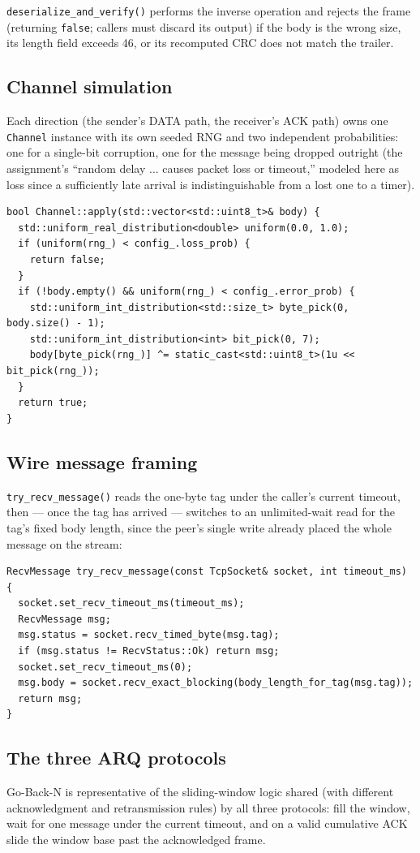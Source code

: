 \documentclass[11pt]{article}
\begin{document}
\texttt{deserialize\_and\_verify()} performs the inverse operation and rejects the frame (returning
\texttt{false}; callers must discard its output) if the body is the wrong size, its length field exceeds 46, or
its recomputed CRC does not match the trailer.

\subsection{Channel simulation}
Each direction (the sender's DATA path, the receiver's ACK path) owns one \texttt{Channel} instance
with its own seeded RNG and two independent probabilities: one for a single-bit corruption, one for
the message being dropped outright (the assignment's ``random delay ... causes packet loss or
timeout,'' modeled here as loss since a sufficiently late arrival is indistinguishable from a lost one to
a timer).

\begin{lstlisting}
bool Channel::apply(std::vector<std::uint8_t>& body) {
  std::uniform_real_distribution<double> uniform(0.0, 1.0);
  if (uniform(rng_) < config_.loss_prob) {
    return false;
  }
  if (!body.empty() && uniform(rng_) < config_.error_prob) {
    std::uniform_int_distribution<std::size_t> byte_pick(0, body.size() - 1);
    std::uniform_int_distribution<int> bit_pick(0, 7);
    body[byte_pick(rng_)] ^= static_cast<std::uint8_t>(1u << bit_pick(rng_));
  }
  return true;
}
\end{lstlisting}

\subsection{Wire message framing}
\texttt{try\_recv\_message()} reads the one-byte tag under the caller's current timeout, then --- once
the tag has arrived --- switches to an unlimited-wait read for the tag's fixed body length, since the
peer's single write already placed the whole message on the stream:

\begin{lstlisting}
RecvMessage try_recv_message(const TcpSocket& socket, int timeout_ms) {
  socket.set_recv_timeout_ms(timeout_ms);
  RecvMessage msg;
  msg.status = socket.recv_timed_byte(msg.tag);
  if (msg.status != RecvStatus::Ok) return msg;
  socket.set_recv_timeout_ms(0);
  msg.body = socket.recv_exact_blocking(body_length_for_tag(msg.tag));
  return msg;
}
\end{lstlisting}

\subsection{The three ARQ protocols}
Go-Back-N is representative of the sliding-window logic shared (with different acknowledgment and
retransmission rules) by all three protocols: fill the window, wait for one message under the
current timeout, and on a valid cumulative ACK slide the window base past the acknowledged frame.
\end{document}
